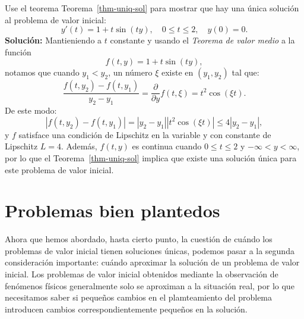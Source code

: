 \documentclass[
  spanish,
  us-letterpaper,
  DIV=11,
  numbers=noendperiod]{scrreprt}
\theoremstyle{definition}
\theoremstyle{plain}
\theoremstyle{remark}
\begin{document}
\begin{tcolorbox}[enhanced jigsaw, title={Ejemplo}, left=2mm, toprule=.15mm, bottomrule=.15mm, breakable, coltitle=black, leftrule=.75mm, toptitle=1mm, colbacktitle=quarto-callout-caution-color!10!white, opacityback=0, rightrule=.15mm, colback=white, titlerule=0mm, arc=.35mm, opacitybacktitle=0.6, bottomtitle=1mm, colframe=quarto-callout-caution-color-frame]

Use el teorema Teorema~\ref{thm-uniq-sol} para mostrar que hay una única
solución al problema de valor inicial: \[
y'(t)= 1 + t\sin(ty), \quad 0\leq t \leq 2, \quad y(0) = 0.
\] \textbf{Solución:} Mantieniendo a \(t\) constante y usando el
\emph{Teorema de valor medio} a la función \[
f(t,y) = 1 + t\sin(ty),
\] notamos que cuando \(y_1<y_2\), un número \(\xi\) existe en
\((y_1,y_2)\) tal que: \[
\dfrac{f(t,y_2)-f(t,y_1)}{y_2-y_1} = \dfrac{\partial}{\partial y} f(t,\xi) = t^2\cos(\xi t).
\] De este modo: \[
|f(t,y_2)-f(t,y_1)| = |y_2-y_1||t^2\cos(\xi t)| \leq 4|y_2-y_1|,
\] y \(f\) satisface una condición de Lipschitz en la variable y con
constante de Lipschitz \(L = 4\). Además, \(f(t, y)\) es continua cuando
\(0 ≤ t ≤ 2\) y \(−∞ < y < ∞\), por lo que el Teorema~\ref{thm-uniq-sol}
implica que existe una solución única para este problema de valor
inicial.

\end{tcolorbox}

\section{Problemas bien plantedos}\label{problemas-bien-plantedos}

Ahora que hemos abordado, hasta cierto punto, la cuestión de cuándo los
problemas de valor inicial tienen soluciones únicas, podemos pasar a la
segunda consideración importante: cuándo aproximar la solución de un
problema de valor inicial. Los problemas de valor inicial obtenidos
mediante la observación de fenómenos físicos generalmente solo se
aproximan a la situación real, por lo que necesitamos saber si pequeños
cambios en el plamteamiento del problema introducen cambios
correspondientemente pequeños en la solución.
\end{document}

